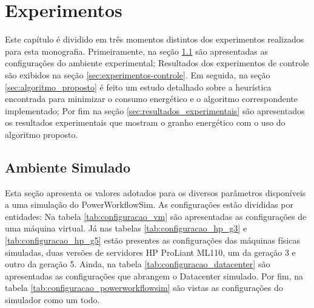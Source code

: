 \chapter{Experimentos}
\label{cap:experimentos}
Este capítulo é dividido em três momentos distintos dos experimentos realizados
para esta monografia. Primeiramente, na seção \ref{sec:ambiente_simulado} são
apresentadas as configurações do ambiente experimental; Resultados dos 
experimentos de controle são exibidos na seção \ref{sec:experimentos-controle}.
Em seguida, na seção
\ref{sec:algoritmo_proposto} é feito um estudo detalhado sobre a heurística
encontrada para minimizar o consumo energético e o algoritmo correspondente
implementado; Por fim na seção \ref{sec:resultados_experimentais} são
apresentados os resultados experimentais que mostram o granho energético com
o uso do algoritmo proposto.


\section{Ambiente Simulado}
\label{sec:ambiente_simulado}
Esta seção apresenta os valores adotados para os diversos parâmetros disponíveis
a uma simulação do PowerWorkflowSim. As configurações estão divididas
por entidades: Na tabela \ref{tab:configuracao_vm} são apresentadas as
configurações de uma máquina virtual. Já nas tabelas \ref{tab:configuracao_hp_g3}
e \ref{tab:configuracao_hp_g5} estão presentes as configurações das máquinas
físicas simuladas, duas versões de servidores HP ProLiant ML110, um da geração 3
e outro da geração 5. Ainda, na tabela \ref{tab:configuracao_datacenter} são
apresentadas as configurações que abrangem o Datacenter simulado. Por fim,
na tabela \ref{tab:configuracao_powerworkflowsim} são vistas as configurações
do simulador como um todo.

